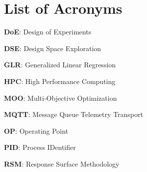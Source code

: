 \chapter*{List of Acronyms}





\textbf{DoE}: Design of Experiments

\bigbreak

\textbf{DSE}: Design Space Exploration

\bigbreak

\textbf{GLR}: Generalized Linear Regression

\bigbreak

\textbf{HPC}: High Performance Computing

\bigbreak

\textbf{MOO}: Multi-Objective Optimization

\bigbreak

\textbf{MQTT}: Message Queue Telemetry Transport

\bigbreak

\textbf{OP}: Operating Point

\bigbreak

\textbf{PID}: Process IDentifier

\bigbreak

\textbf{RSM}: Response Surface Methodology
